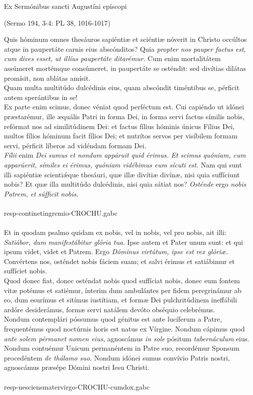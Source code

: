 \documentclass[options]{article}
\begin{document}
	Ex Sermónibus sancti Augustíni epíscopi 
	\begin{flushright}
		(Sermo 194, 3-4: PL 38, 1016-1017)
	\end{flushright}
	Quis hóminum omnes thesáuros sapiéntiæ et sciéntiæ nóverit in Christo occúltos atque in paupertáte carnis eius abscónditos? Quia \emph{propter nos pauper factus est, cum dives esset, ut illíus paupertáte ditarémur.} Cum enim mortalitátem assúmeret mortémque consúmeret, in paupertáte se osténdit: sed divítias dilátas promísit, non ablátas amísit.\\
	Quam multa multitúdo dulcédinis eius, quam abscóndit timéntibus se, pérficit autem sperántibus in se!\\
	Ex parte enim scimus, donec véniat quod perféctum est. Cui capiéndo ut idónei præstarémur, ille æquális Patri in forma Dei, in forma servi factus símilis nobis, refórmat nos ad similitúdinem Dei: et factus fílius hóminis únicus Fílius Dei, multos fílios hóminum facit fílios Dei; et nutrítos servos per visíbilem formam servi, pérficit líberos ad vidéndam formam Dei.\\
	\emph{Fílii} enim \emph{Dei sumus et nondum appáruit quid érimus. Et scimus quóniam, cum apparúerit, símiles ei érimus, quóniam vidébimus eum sícuti est.} Nam qui sunt illi sapiéntiæ scienti\'{æ}que thesáuri, quæ illæ divítiæ divínæ, nisi quia suffíciunt nobis? Et quæ illa multitúdo dulcédinis, nisi quia sátiat nos? \emph{Osténde} ergo \emph{nobis Patrem, et súfficit nobis.}\\
	\\
	resp-continetingremio-CROCHU.gabc\\
	\\
	Et in quodam psalmo quidam ex nobis, vel in nobis, vel pro nobis, ait illi: \emph{Satiábor, dum manifestábitur glória tua.} Ipse autem et Pater unum sunt: et qui ipsum videt, videt et Patrem. Ergo \emph{Dóminus virtútum, ipse est rex glóriæ.} Convértens nos, osténdet nobis fáciem suam; et salvi érimus et satiábimur et suffíciet nobis.\\
	Quod donec fiat, donec osténdat nobis quod suffíciat nobis, donec eum fontem vitæ potémus et satiémur, ínterim dum ambulántes per fidem peregrinámur ab eo, dum esurímus et sitímus iustítiam, et formæ Dei pulchritúdinem ineffábili ardóre desiderámus, formæ servi natálem devóto obséquio celebrémus.\\
	Nondum contemplári póssumus quod génitus est ante lucíferum a Patre, frequentémus quod noctúrnis horis est natus ex Vírgine. Nondum cápimus quod \emph{ante solem pérmanet nomen eius,} agnoscámus \emph{in sole} pósitum \emph{tabernáculum} eius.\\
	Nondum contuémur Unicum permanéntem in Patre suo, recordémur Sponsum procedéntem \emph{de thálamo suo.} Nondum idónei sumus convívio Patris nostri, agnoscámus præsépe Dómini nostri Iesu Christi.\\
	\\
	resp-nesciensmatervirgo-CROCHU-cumdox.gabc	
\end{document}
